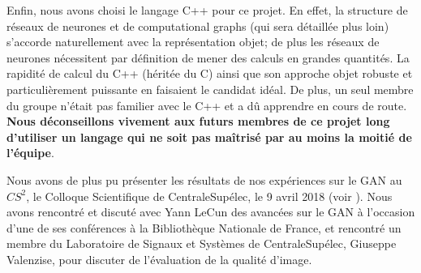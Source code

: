 Enfin, nous avons choisi le langage C++ pour ce projet. En effet, la structure de réseaux de neurones et de computational graphs (qui sera détaillée plus loin) s'accorde naturellement avec la représentation objet; de plus les réseaux de neurones nécessitent par définition de mener des calculs en grandes quantités. La rapidité de calcul du C++ (héritée du C) ainsi que son approche objet robuste et particulièrement puissante en faisaient le candidat idéal. De plus, un seul membre du groupe n'était pas familier avec le C++ et a dû apprendre en cours de route. \textbf{Nous déconseillons vivement aux futurs membres de ce projet long d'utiliser un langage qui ne soit pas maîtrisé par au moins la moitié de l'équipe}. 

Nous avons de plus pu présenter les résultats de nos expériences sur le GAN au $CS^2$, le Colloque Scientifique de CentraleSupélec, le 9 avril 2018 (voir \cite{c2s}). Nous avons rencontré et discuté avec Yann LeCun des avancées sur le GAN à l'occasion d'une de ses conférences à la Bibliothèque Nationale de France, et rencontré un membre du Laboratoire de Signaux et Systèmes de CentraleSupélec, Giuseppe Valenzise, pour discuter de l'évaluation de la qualité d'image.

\newpage
